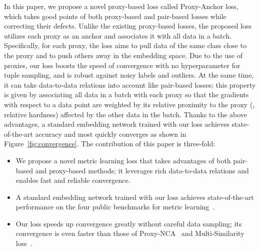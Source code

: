 \documentclass[10pt,twocolumn,letterpaper]{article}
\begin{document}
In this paper, we propose a novel proxy-based loss called Proxy-Anchor loss, which takes good points of both proxy-based and pair-based losses while correcting their defects. 
Unlike the existing proxy-based losses, the proposed loss utilizes each proxy as an anchor and associates it with all data in a batch.
Specifically, for each proxy, the loss aims to pull data of the same class close to the proxy and to push others away in the embedding space. 
Due to the use of proxies, our loss boosts the speed of convergence with no hyperparameter for tuple sampling, and is robust against noisy labels and outliers.
At the same time, it can take data-to-data relations into account like pair-based losses;
this property is given by associating all data in a batch with each proxy so that the gradients with respect to a data point are weighted by its relative proximity to the proxy (\ie, relative hardness) affected by the other data in the batch.
Thanks to the above advantages, a standard embedding network trained with our loss achieves state-of-the-art accuracy and most quickly converges as shown in Figure~\ref{fig:convergence}.
The contribution of this paper is three-fold: 
\vspace{-2mm}
\begin{itemize}[leftmargin=*]
   \setlength\itemsep{-1mm}
   \item We propose a novel metric learning loss that takes advantages of both pair-based and proxy-based methods; it leverages rich data-to-data relations and enables fast and reliable convergence.
   \item A standard embedding network trained with our loss achieves state-of-the-art performance on the four public benchmarks for metric learning~\cite{CUB200,krause20133d,songCVPR16,DeepFashion}.
   \item Our loss speeds up convergence greatly without careful data sampling; its convergence is even faster than those of  Proxy-NCA~\cite{movshovitz2017no} and Multi-Similarity loss~\cite{wang2019multi}.
\end{itemize}






\end{document}
